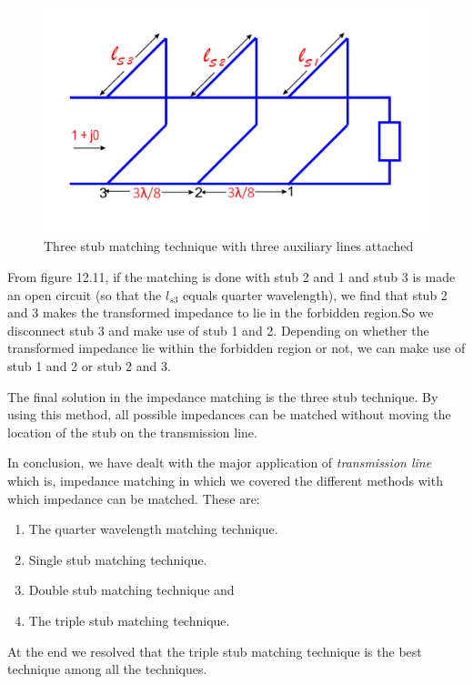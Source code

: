 \begin{figure}[h]
\centering
\includegraphics[width=1\linewidth]{./graphics/fig13}
\caption{Three stub matching technique with three auxiliary lines attached}
\end{figure}

From figure 12.11, if the matching is done with stub 2 and 1 and stub 3 is made an open circuit (so that the $ l_{s3}$ equals quarter wavelength), we find that stub 2 and 3 makes the transformed impedance to lie in the forbidden region.So we disconnect stub 3 and make use of stub 1 and 2. Depending on whether the transformed impedance lie within the forbidden region or not, we can make use of stub 1 and 2 or stub 2 and 3. 

The final solution in the impedance matching is the three stub technique. By using this method, all possible impedances can be matched without moving the location of the stub on the transmission line.

In conclusion,  we have dealt with the major application of \textit{transmission line} which is, impedance matching in which we covered the different methods with which impedance can be matched. These are:
\begin{enumerate}
\item The quarter wavelength matching technique.
\item Single stub matching technique.
\item Double stub matching technique and
\item The triple stub matching technique.
\end{enumerate}

At the end we resolved that the triple stub matching technique is the best technique among all the techniques.
